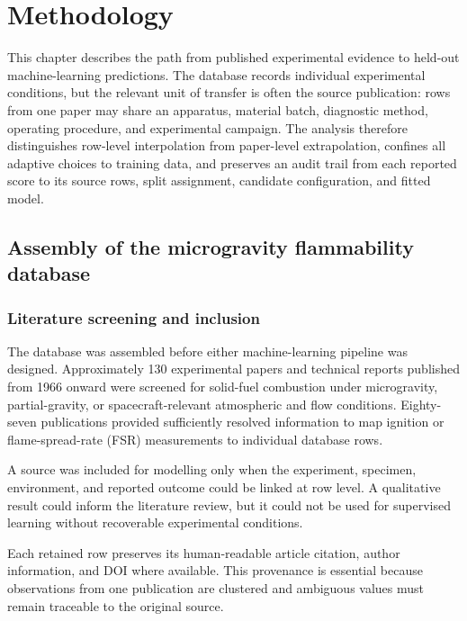 \chapter{Methodology}
\label{chap:methodology}

This chapter describes the path from published experimental evidence to
held-out machine-learning predictions. The database records individual
experimental conditions, but the relevant unit of transfer is often the source
publication: rows from one paper may share an apparatus, material batch,
diagnostic method, operating procedure, and experimental campaign. The
analysis therefore distinguishes row-level interpolation from paper-level
extrapolation, confines all adaptive choices to training data, and preserves
an audit trail from each reported score to its source rows, split assignment,
candidate configuration, and fitted model.

\section{Assembly of the microgravity flammability database}
\label{sec:database-assembly}

\subsection{Literature screening and inclusion}

The database was assembled before either machine-learning pipeline was designed.
Approximately 130 experimental papers and technical reports published from 1966
onward were screened for solid-fuel combustion under microgravity,
partial-gravity, or spacecraft-relevant atmospheric and flow conditions.
Eighty-seven publications provided sufficiently resolved information to map
ignition or flame-spread-rate (FSR) measurements to individual database rows.

A source was included for modelling only when the experiment, specimen,
environment, and reported outcome could be linked at row level. A qualitative
result could inform the literature review, but it could not be used for
supervised learning without recoverable experimental conditions.

Each retained row preserves its human-readable article citation, author
information, and DOI where available. This provenance is essential because
observations from one publication are clustered and ambiguous values must remain
traceable to the original source.

